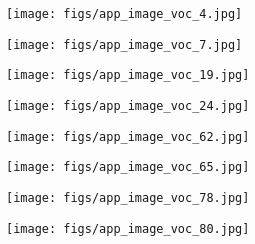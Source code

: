 \documentclass[10pt,twocolumn,letterpaper]{article}
\begin{document}
\begin{figure}[!t]
\centering
    \begin{subfigure}{0.135\linewidth}
        \centering
        \texttt{[image: figs/app\_image\_voc\_4.jpg]}
\end{subfigure}
    \begin{subfigure}{0.135\linewidth}
        \centering
        \texttt{[image: figs/app\_image\_voc\_7.jpg]}
\end{subfigure}
    \begin{subfigure}{0.135\linewidth}
        \centering
        \texttt{[image: figs/app\_image\_voc\_19.jpg]}
\end{subfigure}
    \begin{subfigure}{0.135\linewidth}
        \centering
        \texttt{[image: figs/app\_image\_voc\_24.jpg]}
\end{subfigure}
    \begin{subfigure}{0.085\linewidth}
        \centering
        \texttt{[image: figs/app\_image\_voc\_62.jpg]}
\end{subfigure}
    \begin{subfigure}{0.085\linewidth}
        \centering
        \texttt{[image: figs/app\_image\_voc\_65.jpg]}
\end{subfigure}
    \begin{subfigure}{0.075\linewidth}
        \centering
        \texttt{[image: figs/app\_image\_voc\_78.jpg]}
\end{subfigure}
    \begin{subfigure}{0.135\linewidth}
        \centering
        \texttt{[image: figs/app\_image\_voc\_80.jpg]}
\end{subfigure}


\end{figure}
\end{document}
